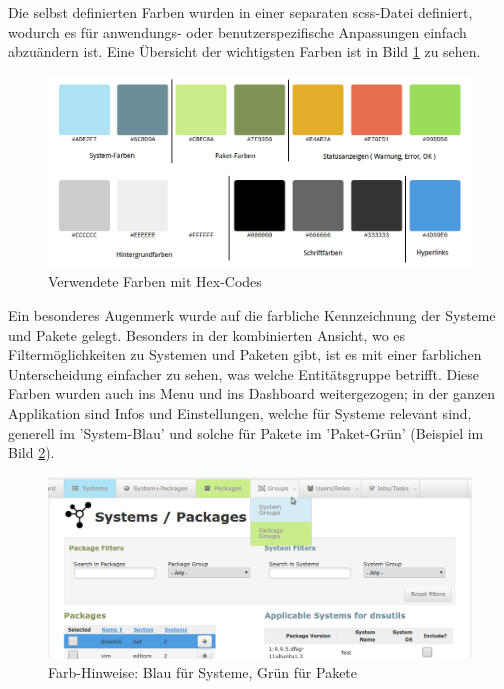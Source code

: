 Die selbst definierten Farben wurden in einer separaten \gls{scss}-Datei definiert, wodurch es für anwendungs- oder benutzerspezifische Anpassungen einfach abzuändern ist. Eine Übersicht der wichtigsten Farben ist in Bild \ref{fig:design:colorcodes} zu sehen.

\begin{figure}[H]
	\centering
	\includegraphics[width=\linewidth]{files/colorcodes}
	\caption{Verwendete Farben mit Hex-Codes}
	\label{fig:design:colorcodes}
\end{figure}

Ein besonderes Augenmerk wurde auf die farbliche Kennzeichnung der Systeme und Pakete gelegt. Besonders in der kombinierten Ansicht, wo es Filtermöglichkeiten zu Systemen und Paketen gibt, ist es mit einer farblichen Unterscheidung einfacher zu sehen, was welche Entitätsgruppe betrifft. Diese Farben wurden auch ins Menu und ins Dashboard weitergezogen; in der ganzen Applikation sind Infos und Einstellungen, welche für Systeme relevant sind, generell im 'System-Blau' und solche für Pakete im 'Paket-Grün' (Beispiel im Bild \ref{fig:design:sys_pkg_colors}).

\begin{figure}[H]
	\centering
	\includegraphics[width=\linewidth]{files/colors_pkg_sys}
	\caption{Farb-Hinweise: Blau für Systeme, Grün für Pakete}
	\label{fig:design:sys_pkg_colors}
\end{figure}

